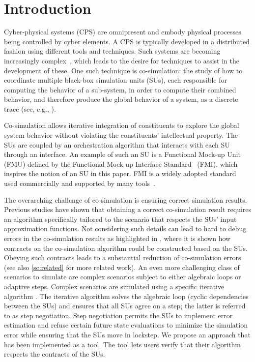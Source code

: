 \section{Introduction}\label{sc:introduction}
Cyber-physical systems (CPS) are omnipresent and embody physical processes being controlled by cyber elements. A CPS is typically developed in a distributed fashion using different tools and techniques. Such systems are becoming increasingly complex~\cite{4519604}, which leads to the desire for techniques to assist in the development of these.
One such technique is co-simulation: the study of how to coordinate multiple black-box simulation units (SUs), each responsible for computing the behavior of a sub-system, in order to compute their combined behavior, and therefore produce the global behavior of a system, as a discrete trace (see, e.g., \cite{Kubler2000,Gomes2018}).

Co-simulation allows iterative integration of constituents to explore the global system behavior without violating the constituents' intellectual property. 
The SUs are coupled by an orchestration algorithm that interacts with each SU through an interface.
An example of such an SU is a Functional Mock-up Unit (FMU) defined by the Functional Mock-up Interface Standard~\cite{FMI2014} (FMI), which inspires the notion of an SU in this paper. FMI is a widely adopted standard used commercially and supported by many tools~\cite{Tools_FMI}.

The overarching challenge of co-simulation is ensuring correct simulation results. Previous studies \cite{Gomes2019,Oakes2021,Gomes2018f,Schweizer2015c} have shown that obtaining a correct co-simulation result requires an algorithm specifically tailored to the scenario that respects the SUs' input approximation functions. Not considering such details can lead to hard to debug errors in the co-simulation results as highlighted in \cite{Gomes2019,Oakes2021}, where it is shown how contracts on the co-simulation algorithm could be constructed based on the SUs. Obeying such contracts leads to a substantial reduction of co-simulation errors (see also \cref{sc:related} for more related work). An even more challenging class of scenarios to simulate are complex scenarios subject to either algebraic loops or adaptive steps. Complex scenarios are simulated using a specific iterative algorithm \cite{thrane2021}. The iterative algorithm solves the algebraic loop (cyclic dependencies between the SUs) and ensures that all SUs agree on a step; the latter is referred to as step negotiation. Step negotiation permits the SUs to implement error estimation and refuse certain future state evaluations to minimize the simulation error while ensuring that the SUs move in lockstep.
We propose an approach that has been implemented as a tool. The tool lets users verify that their algorithm respects the contracts of the SUs.

